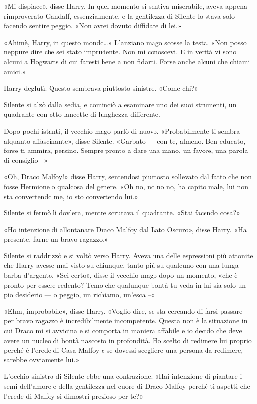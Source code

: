 «Mi dispiace», disse Harry. In quel momento si sentiva miserabile, aveva appena rimproverato Gandalf, essenzialmente, e la gentilezza di Silente lo stava solo facendo sentire peggio. «Non avrei dovuto diffidare di lei.»

«Ahimè, Harry, in questo mondo…» L’anziano mago scosse la testa. «Non posso neppure dire che sei stato imprudente. Non mi conoscevi. E in verità vi sono alcuni a Hogwarts di cui faresti bene a non fidarti. Forse anche alcuni che chiami amici.»

Harry deglutì. Questo sembrava piuttosto sinistro. «Come chi?»

Silente si alzò dalla sedia, e cominciò a esaminare uno dei suoi strumenti, un quadrante con otto lancette di lunghezza differente.

Dopo pochi istanti, il vecchio mago parlò di nuovo. «Probabilmente ti sembra alquanto affascinante», disse Silente. «Garbato — con te, almeno. Ben educato, forse ti ammira, persino. Sempre pronto a dare una mano, un favore, una parola di consiglio –»

«Oh, Draco Malfoy!» disse Harry, sentendosi piuttosto sollevato dal fatto che non fosse Hermione o qualcosa del genere. «Oh no, no no no, ha capito male, lui non sta convertendo me, io sto convertendo lui.»

Silente si fermò lì dov’era, mentre scrutava il quadrante. «Stai facendo cosa?»

«Ho intenzione di allontanare Draco Malfoy dal Lato Oscuro», disse Harry. «Ha presente, farne un bravo ragazzo.»

Silente si raddrizzò e si voltò verso Harry. Aveva una delle espressioni più attonite che Harry avesse mai visto su chiunque, tanto più su qualcuno con una lunga barba d’argento. «Sei certo», disse il vecchio mago dopo un momento, «che è pronto per essere redento? Temo che qualunque bontà tu veda in lui sia solo un pio desiderio — o peggio, un richiamo, un’esca –»

«Ehm, improbabile», disse Harry. «Voglio dire, se sta cercando di farsi passare per bravo ragazzo è incredibilmente incompetente. Questa non è la situazione in cui Draco mi si avvicina e si comporta in maniera affabile e io decido che deve avere un nucleo di bontà nascosto in profondità. Ho scelto di redimere lui proprio perché è l’erede di Casa Malfoy e se dovessi scegliere una persona da redimere, sarebbe ovviamente lui.»

L’occhio sinistro di Silente ebbe una contrazione. «Hai intenzione di piantare i semi dell’amore e della gentilezza nel cuore di Draco Malfoy perché ti aspetti che l’erede di Malfoy si dimostri prezioso per te?»

